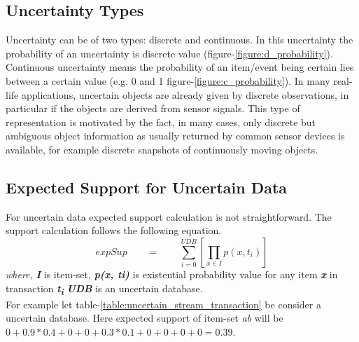 \subsection{Uncertainty Types}
Uncertainty can be of two types: discrete and continuous. In this uncertainty the probability of an uncertainty is discrete value (figure-\ref{figure:d_probability}). Continuous uncertainty means the probability of an item/event being certain lies between a certain value (e.g. 0 and 1 figure-\ref{figure:c_probability}). In many real-life applications, uncertain objects are already given by discrete observations, in particular if the objects are derived from sensor signals. This type of representation is motivated by the fact, in many cases, only discrete but ambiguous object information as usually returned by common sensor devices is available, for example discrete snapshots of continuously moving objects.

\subsection{Expected Support for Uncertain Data}
For uncertain data expected support calculation is not straightforward. The support calculation follows the following equation.
    \begin{equation}
expSup \qquad = \qquad \sum_{i = 0}^{UDB} [\prod_{x \in I } p(x , t_i)]
    \end{equation}
\emph {where,}    \textbf{\emph {I}} is item-set,    \textbf{\emph { p(x, ti)}} is existential probability value for any item \textbf{\emph {x}} in transaction \textbf{\emph {t\textsubscript{i}}} \textbf{\emph {UDB}} is an uncertain database.\\
For example let table-\ref{table:uncertain_stream_transaction} be consider a uncertain database. Here expected support of item-set \emph{ab} will be $0+0.9*0.4+0+0+0.3*0.1+0+0+0+0=0.39$.

